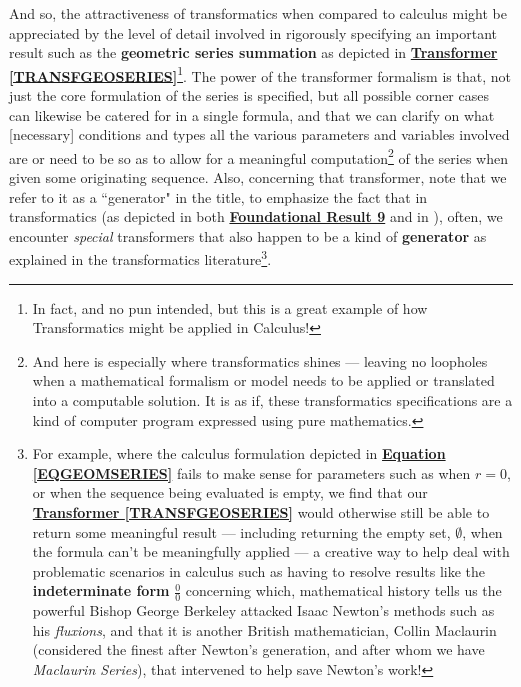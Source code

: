 \documentclass[a4paper, 18pt]{book} %
\begin{document}
\begin{appendices}
And so, the attractiveness of transformatics when compared to calculus might be appreciated by the level of detail involved in rigorously specifying an important result such as the \textbf{geometric series summation} as depicted in \textbf{\hyperref[TRANSFGEOSERIES]{Transformer \ref{TRANSFGEOSERIES}}}\footnote{In fact, and no pun intended, but this is a great example of how Transformatics might be applied in Calculus!}. The power of the transformer formalism is that, not just the core formulation of the series is specified, but all possible corner cases can likewise be catered for in a single formula, and that we can clarify on what [necessary] conditions and types all the various parameters and variables involved are or need to be so as to allow for a meaningful computation\footnote{And here is especially where transformatics shines --- leaving no loopholes when a mathematical formalism or model needs to be applied or translated into a computable solution. It is as if, these transformatics specifications are a kind of computer program expressed using pure mathematics.} of the series when given some originating sequence. Also, concerning that transformer, note that we refer to it as a ``generator" in the title, to emphasize the fact that in transformatics (as depicted in both \textbf{\hyperref[RES9]{Foundational Result 9}} and in \cite{lutalo2025transformatic}), often, we encounter \textit{special} transformers that also happen to be a kind of \textbf{generator} as explained in the transformatics literature\footnote{For example, where the calculus formulation depicted in \textbf{\hyperref[EQGEOMSERIES]{Equation \ref{EQGEOMSERIES}}} fails to make sense for parameters such as when $r=0$, or when the sequence being evaluated is empty, we find that our \textbf{\hyperref[TRANSFGEOSERIES]{Transformer \ref{TRANSFGEOSERIES}}} would otherwise still be able to return some meaningful result --- including returning the empty set, $\emptyset$, when the formula can't be meaningfully applied --- a creative way to help deal with problematic scenarios in calculus such as having to resolve results like the \textbf{indeterminate form} $\frac{0}{0}$ concerning which, mathematical history\cite{Grossman1986CalculusOneVariable} tells us the powerful Bishop George Berkeley attacked Isaac Newton's methods such as his \textit{fluxions}, and that it is another British mathematician, Collin Maclaurin (considered the finest after Newton's generation, and after whom we have \textit{Maclaurin Series}), that intervened to help save Newton's work!}.



\end{appendices}
\end{document}
